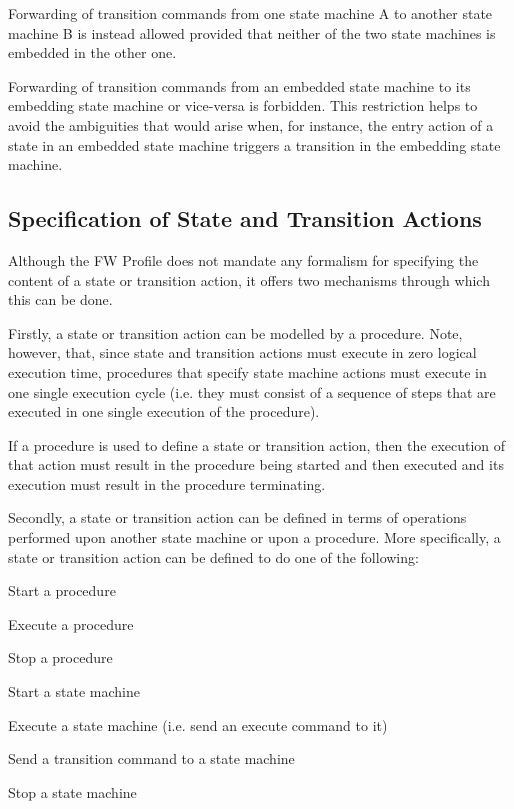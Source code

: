 \documentclass[definition]{../fwprofile}
\begin{document}
Forwarding of transition commands from one state machine A to another state machine B is
instead allowed provided that neither of the two state machines is embedded in the other one.

Forwarding of transition commands from an embedded state machine to its embedding state
machine or vice-versa is forbidden. This restriction helps to avoid the ambiguities that would
arise when, for instance, the entry action of a state in an embedded state machine triggers a
transition in the embedding state machine.

\subsection{Specification of State and Transition Actions}
Although the FW Profile does not mandate any formalism for specifying the content of a state
or transition action, it offers two mechanisms through which this can be done.

Firstly, a state or transition action can be modelled by a procedure. Note, however, that, since
state and transition actions must execute in zero logical execution time, procedures that specify state
machine actions must execute in one single execution cycle (i.e. they must consist of a
sequence of steps that are executed in one single execution of the procedure).

If a procedure is used to define a state or transition action, then the execution of that action must result in the procedure being started and then executed and its execution must result in the procedure terminating.

Secondly, a state or transition action can be defined in terms of operations performed upon
another state machine or upon a procedure. More specifically, a state or transition action can be
defined to do one of the following:

\begin{fw_itemize} 
\item Start a procedure
\item Execute a procedure
\item Stop a procedure
\item Start a state machine
\item Execute a state machine (i.e. send an execute command to it)
\item Send a transition command to a state machine 
\item Stop a state machine 
\end{fw_itemize}
\end{document}
